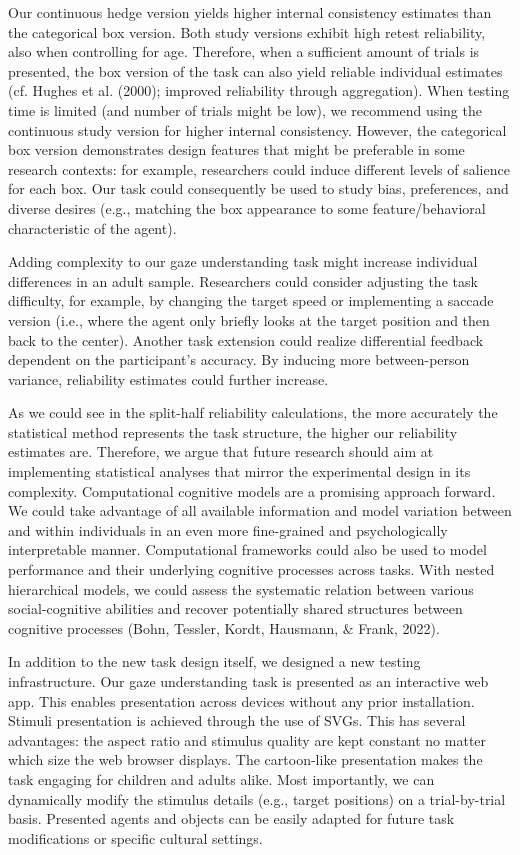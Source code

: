 \documentclass[
  man,floatsintext]{apa6}
\begin{document}
Our continuous hedge version yields higher internal consistency estimates than the categorical box version.
Both study versions exhibit high retest reliability, also when controlling for age.
Therefore, when a sufficient amount of trials is presented, the box version of the task can also yield reliable individual estimates (cf. Hughes et al. (2000); improved reliability through aggregation).
When testing time is limited (and number of trials might be low), we recommend using the continuous study version for higher internal consistency.
However, the categorical box version demonstrates design features that might be preferable in some research contexts: for example, researchers could induce different levels of salience for each box.
Our task could consequently be used to study bias, preferences, and diverse desires (e.g., matching the box appearance to some feature/behavioral characteristic of the agent).

Adding complexity to our gaze understanding task might increase individual differences in an adult sample.
Researchers could consider adjusting the task difficulty, for example, by changing the target speed or implementing a saccade version (i.e., where the agent only briefly looks at the target position and then back to the center).
Another task extension could realize differential feedback dependent on the participant's accuracy.
By inducing more between-person variance, reliability estimates could further increase.

As we could see in the split-half reliability calculations, the more accurately the statistical method represents the task structure, the higher our reliability estimates are.
Therefore, we argue that future research should aim at implementing statistical analyses that mirror the experimental design in its complexity.
Computational cognitive models are a promising approach forward.
We could take advantage of all available information and model variation between and within individuals in an even more fine-grained and psychologically interpretable manner.
Computational frameworks could also be used to model performance and their underlying cognitive processes across tasks.
With nested hierarchical models, we could assess the systematic relation between various social-cognitive abilities and recover potentially shared structures between cognitive processes (Bohn, Tessler, Kordt, Hausmann, \& Frank, 2022).

In addition to the new task design itself, we designed a new testing infrastructure.
Our gaze understanding task is presented as an interactive web app.
This enables presentation across devices without any prior installation.
Stimuli presentation is achieved through the use of SVGs.
This has several advantages: the aspect ratio and stimulus quality are kept constant no matter which size the web browser displays.
The cartoon-like presentation makes the task engaging for children and adults alike.
Most importantly, we can dynamically modify the stimulus details (e.g., target positions) on a trial-by-trial basis.
Presented agents and objects can be easily adapted for future task modifications or specific cultural settings.
\end{document}
